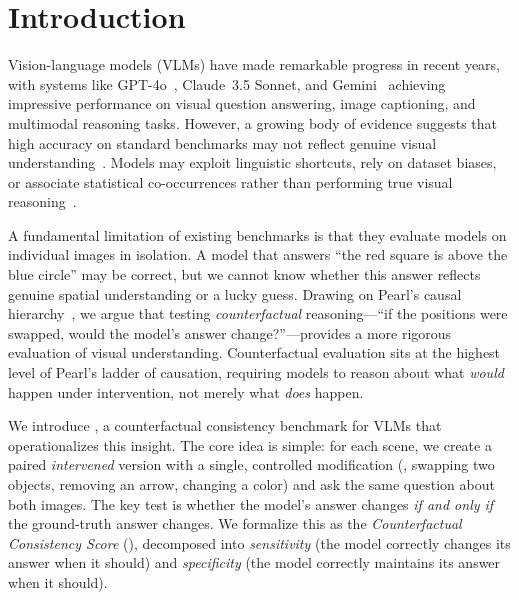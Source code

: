 \section{Introduction}
\label{sec:intro}

Vision-language models (VLMs) have made remarkable progress in recent years, with systems like GPT-4o~\cite{radford2021clip}, Claude~3.5 Sonnet, and Gemini~\cite{li2023blip2} achieving impressive performance on visual question answering, image captioning, and multimodal reasoning tasks. However, a growing body of evidence suggests that high accuracy on standard benchmarks may not reflect genuine visual understanding~\cite{thrush2022winoground, yuksekgonul2023aro, tong2024eyeswideShut}. Models may exploit linguistic shortcuts, rely on dataset biases, or associate statistical co-occurrences rather than performing true visual reasoning~\cite{hsieh2023sugarcrepe, huang2024conme}.

A fundamental limitation of existing benchmarks is that they evaluate models on individual images in isolation. A model that answers ``the red square is above the blue circle'' may be correct, but we cannot know whether this answer reflects genuine spatial understanding or a lucky guess. Drawing on Pearl's causal hierarchy~\cite{pearl2009causality, pearl2018bookofwhy}, we argue that testing \emph{counterfactual} reasoning---``if the positions were swapped, would the model's answer change?''---provides a more rigorous evaluation of visual understanding. Counterfactual evaluation sits at the highest level of Pearl's ladder of causation, requiring models to reason about what \emph{would} happen under intervention, not merely what \emph{does} happen.

We introduce \method, a counterfactual consistency benchmark for VLMs that operationalizes this insight. The core idea is simple: for each scene, we create a paired \emph{intervened} version with a single, controlled modification (\eg, swapping two objects, removing an arrow, changing a color) and ask the same question about both images. The key test is whether the model's answer changes \emph{if and only if} the ground-truth answer changes. We formalize this as the \emph{Counterfactual Consistency Score} (\ccs), decomposed into \emph{sensitivity} (the model correctly changes its answer when it should) and \emph{specificity} (the model correctly maintains its answer when it should).

